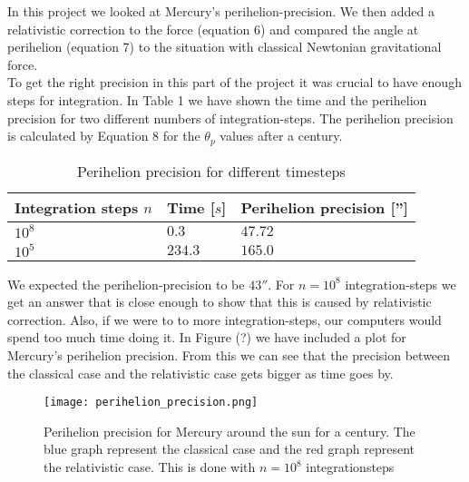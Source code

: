 \documentclass[%
 reprint,
 nobalance,
 amsmath,amssymb,
 aps,
]{revtex4-1}
\begin{document}
In this project we looked at Mercury's perihelion-precision. We then added a relativistic correction to the force (equation 6) and compared the angle at perihelion (equation 7) to the situation with classical Newtonian gravitational force.\\
To get the right precision in this part of the project it was crucial to have enough steps for integration. In Table 1 we have shown the time and the perihelion precision for two different numbers of integration-steps. The perihelion precision is calculated by Equation 8 for the $\theta_p$ values after a century.

\begin{table}[h]
\centering
\caption{Perihelion precision for different timesteps}
\label{my-label}
\begin{tabular}{|l|l|l|}
\hline
\textbf{Integration steps $n$} & \textbf{Time {[}$s${]}} & \textbf{Perihelion precision {[}''{]}} \\ \hline
$10^8$                 & $0.3$                   & $47.72$                                \\ \hline
$10^5$                 & $234.3$                 & $165.0$                                \\ \hline
\end{tabular}
\end{table}


We expected the perihelion-precision to be $43''$. For $n=10^8$ integration-steps we get an answer that is close enough to show that this is caused by relativistic correction. Also, if we were to to more integration-steps, our computers would spend too much time doing it.
 In Figure (?) we have included a plot for Mercury's perihelion precision. From this we can see that the precision between the classical case and the relativistic case gets bigger as time goes by.
\begin{figure}[h]
\centering
\texttt{[image: perihelion\_precision.png]} \caption{Perihelion precision for Mercury around the sun for a century. The blue graph represent the classical case and the red graph represent the relativistic case. This is done with $n=10^8$ integrationsteps}
\end{figure}





\end{document}
